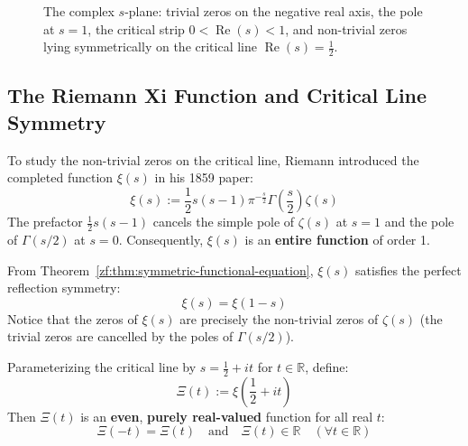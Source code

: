 \documentclass[a4paper]{article}
\begin{document}
\begin{figure}[htbp]
\caption{The complex $s$-plane: trivial zeros on the negative real axis, the pole at $s=1$, the critical strip $0 < \operatorname{Re}(s) < 1$, and non-trivial zeros lying symmetrically on the critical line $\operatorname{Re}(s) = \frac{1}{2}$.}
\label{zf:fig:critical-strip}
\end{figure}

\subsection{The Riemann Xi Function and Critical Line Symmetry}\label{zf:subsec:xi-function}

To study the non-trivial zeros on the critical line, Riemann introduced the completed function $\xi(s)$ in his 1859 paper:
\begin{equation}
    \label{zf:eq:xi-definition}
    \xi(s) := \frac{1}{2} s(s-1) \pi^{-\frac{s}{2}} \Gamma\left(\frac{s}{2}\right) \zeta(s)
\end{equation}
The prefactor $\frac{1}{2} s(s-1)$ cancels the simple pole of $\zeta(s)$ at $s=1$ and the pole of $\Gamma(s/2)$ at $s=0$. Consequently, $\xi(s)$ is an \textbf{entire function} of order 1. 

From Theorem~\ref{zf:thm:symmetric-functional-equation}, $\xi(s)$ satisfies the perfect reflection symmetry:
\begin{equation}
    \label{zf:eq:xi-reflection}
    \xi(s) = \xi(1-s)
\end{equation}
Notice that the zeros of $\xi(s)$ are precisely the non-trivial zeros of $\zeta(s)$ (the trivial zeros are cancelled by the poles of $\Gamma(s/2)$).

\begin{theorem}\label{zf:thm:xi-real}
Parameterizing the critical line by $s = \frac{1}{2} + it$ for $t \in \mathbb{R}$, define:
\begin{equation}
    \label{zf:eq:xi-t-def}
    \Xi(t) := \xi\left(\frac{1}{2} + it\right)
\end{equation}
Then $\Xi(t)$ is an \textbf{even}, \textbf{purely real-valued} function for all real $t$:
\begin{equation*}
    \Xi(-t) = \Xi(t) \quad \text{and} \quad \Xi(t) \in \mathbb{R} \quad (\forall t \in \mathbb{R})
\end{equation*}
\end{theorem}
\end{document}
